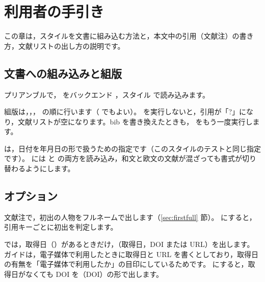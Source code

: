 \section{利用者の手引き}\label{sec:user}
この章は，スタイルを文書に組み込む方法と，本文中の引用（文献注）の書き方，文献リストの出し方の説明です。

\subsection{文書への組み込みと組版}
プリアンブルで， をバックエンド ，スタイル  で読み込みます。


組版は，，， の順に行います（ でもよい）。 を実行しないと，引用が「?」になり，文献リストが空になります。bib を書き換えたときも， をもう一度実行します。

\begin{caution}
 は，日付を年月日の形で扱うための指定です（このスタイルのテストと同じ指定です）。 には  と  の両方を読み込み，和文と欧文の文献が混ざっても書式が切り替わるようにします。
\end{caution}

\subsection{オプション}\label{sec:options}
\begin{optionlist}

文献注で，初出の人物をフルネームで出します（\ref{sec:firstfull} 節）。 にすると，引用キーごとに初出を判定します。


 では，取得日（）があるときだけ，（取得日，DOI または URL）を出します。ガイドは，電子媒体で利用したときに取得日と URL を書くとしており，取得日の有無を「電子媒体で利用したか」の目印にしているためです。 にすると，取得日がなくても DOI を（DOI）の形で出します。
\end{optionlist}

